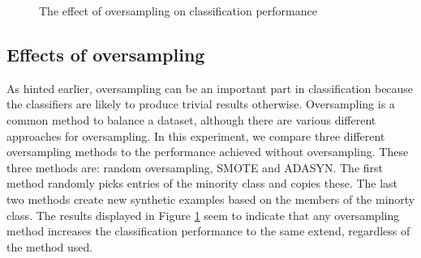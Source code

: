 \datathree

\begin{figure}[]
	\caption{The effect of oversampling on classification performance}
	\label{fig:res_bar_3}
\end{figure}

\subsection{Effects of oversampling}
As hinted earlier, oversampling can be an important part in classification because the classifiers are likely to produce trivial results otherwise. Oversampling is a common method to balance a dataset, although there are various different approaches for oversampling. In this experiment, we compare three different oversampling methods to the performance achieved without oversampling. These three methods are: random oversampling, SMOTE and ADASYN. The first method randomly picks entries of the minority class and copies these. The last two methods create new synthetic examples based on the members of the minorty class.
The results displayed in Figure \ref{fig:res_bar_3} seem to indicate that any oversampling method increases the classification performance to the same extend, regardless of the method used.




